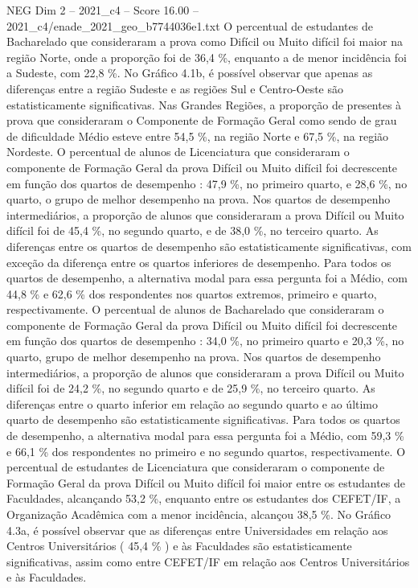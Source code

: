 \begin{textsample}{NEG Dim 2 – 2021\_c4 – Score 16.00 – 2021\_c4/enade\_2021\_geo\_b7744036e1.txt}
O percentual de estudantes de Bacharelado que consideraram a prova como Difícil ou Muito difícil foi maior na região Norte, onde a proporção foi de 36,4 \%, enquanto a de menor incidência foi a Sudeste, com 22,8 \%.
No Gráfico 4.1b, é possível observar que apenas as diferenças entre a região Sudeste e as regiões Sul e Centro-Oeste são estatisticamente significativas.
Nas Grandes Regiões, a proporção de presentes à prova que consideraram o Componente de Formação Geral como sendo de grau de dificuldade Médio esteve entre 54,5 \%, na região Norte e 67,5 \%, na região Nordeste.
O percentual de alunos de Licenciatura que consideraram o componente de Formação Geral da prova Difícil ou Muito difícil foi decrescente em função dos quartos de desempenho : 47,9 \%, no primeiro quarto, e 28,6 \%, no quarto, o grupo de melhor desempenho na prova.
Nos quartos de desempenho intermediários, a proporção de alunos que consideraram a prova Difícil ou Muito difícil foi de 45,4 \%, no segundo quarto, e de 38,0 \%, no terceiro quarto.
As diferenças entre os quartos de desempenho são estatisticamente significativas, com exceção da diferença entre os quartos inferiores de desempenho.
Para todos os quartos de desempenho, a alternativa modal para essa pergunta foi a Médio, com 44,8 \% e 62,6 \% dos respondentes nos quartos extremos, primeiro e quarto, respectivamente.
O percentual de alunos de Bacharelado que consideraram o componente de Formação Geral da prova Difícil ou Muito difícil foi decrescente em função dos quartos de desempenho : 34,0 \%, no primeiro quarto e 20,3 \%, no quarto, grupo de melhor desempenho na prova.
Nos quartos de desempenho intermediários, a proporção de alunos que consideraram a prova Difícil ou Muito difícil foi de 24,2 \%, no segundo quarto e de 25,9 \%, no terceiro quarto.
As diferenças entre o quarto inferior em relação ao segundo quarto e ao último quarto de desempenho são estatisticamente significativas.
Para todos os quartos de desempenho, a alternativa modal para essa pergunta foi a Médio, com 59,3 \% e 66,1 \% dos respondentes no primeiro e no segundo quartos, respectivamente.
O percentual de estudantes de Licenciatura que consideraram o componente de Formação Geral da prova Difícil ou Muito difícil foi maior entre os estudantes de Faculdades, alcançando 53,2 \%, enquanto entre os estudantes dos CEFET/IF, a Organização Acadêmica com a menor incidência, alcançou 38,5 \%.
No Gráfico 4.3a, é possível observar que as diferenças entre Universidades em relação aos Centros Universitários ( 45,4 \% ) e às Faculdades são estatisticamente significativas, assim como entre CEFET/IF em relação aos Centros Universitários e às Faculdades.

\end{textsample}

